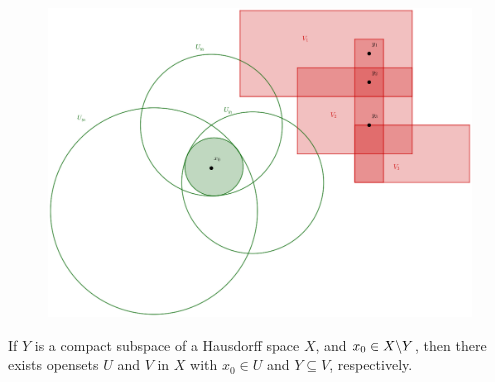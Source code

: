\begin{figure}[h] 
    \centering
    \includegraphics[scale=0.2]{Figures/Chapter3/compactHausdorff1.eps}
    \caption{}
    \label{fig_3.1}
\end{figure}

\begin{corollary}
    If $Y$ is a compact subspace of a Hausdorff space $X$, and  $ x_0 \in X \backslash Y$, then there
    exists opensets $U$ and  $V$ in  $X$ with  $ x_0 \in U$ and $Y \subseteq V$, respectively.
\end{corollary}
